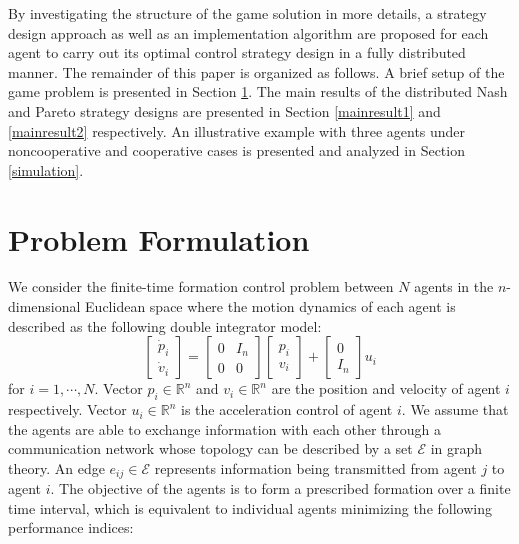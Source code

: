 \documentclass[12pt,draftcls,onecolumn]{IEEEtran}  %
\begin{document}
By investigating the structure of the game solution in more details, a strategy design approach as well as an implementation algorithm are proposed for each agent to carry out its optimal control strategy design in a fully distributed manner. The remainder of this paper is organized as follows. A brief setup of the game problem is presented in Section \ref{setup}. The main results of the distributed Nash and Pareto strategy designs are presented in Section \ref{mainresult1} and \ref{mainresult2} respectively. An illustrative example with three agents under noncooperative and cooperative cases is presented and analyzed in Section \ref{simulation}.


\section{Problem Formulation}\label{setup}
We consider the finite-time formation control problem between $N$ agents in the $n$-dimensional Euclidean space where the motion dynamics of each agent is described as the following double integrator model:
\begin{equation}
\begin{bmatrix}
\dot{p}_i\\ \dot{v}_i
\end{bmatrix}=\begin{bmatrix}
0&I_n\\0&0
\end{bmatrix}\begin{bmatrix}
p_i\\
v_i\end{bmatrix}+\begin{bmatrix}
0\\ I_n
\end{bmatrix}u_i\label{systemxi}
\end{equation}
for $i=1,\cdots,N$. Vector $p_i\in\mathbb{R}^n$ and $v_i\in\mathbb{R}^n$ are the position and velocity of agent $i$ respectively. Vector $u_i\in\mathbb{R}^{n}$ is the acceleration control of agent $i$. We assume that the agents are able to exchange information with each other through a communication network {whose topology can be described by a set $\mathcal{E}$ in graph theory. An edge $e_{ij}\in\mathcal{E}$ represents information being transmitted from agent $j$ to agent $i$}. The objective of the agents is to form a prescribed formation over a finite time interval, which is equivalent to individual agents minimizing the following performance indices:
\end{document}
